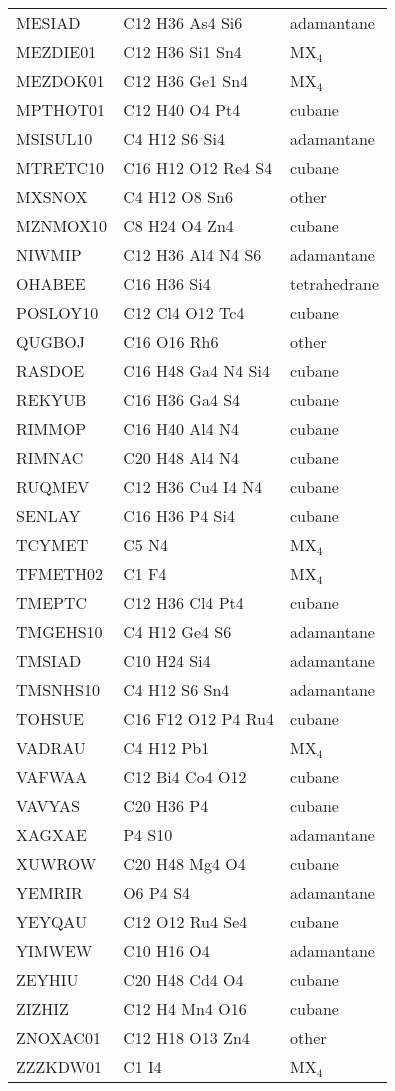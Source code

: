 \documentclass{article}
\begin{document}
\begin{tabular}{lll}
MESIAD & C12 H36 As4 Si6 & adamantane\\
MEZDIE01 & C12 H36 Si1 Sn4 & MX$_4$\\
MEZDOK01 & C12 H36 Ge1 Sn4 & MX$_4$\\
MPTHOT01 & C12 H40 O4 Pt4 & cubane \\
MSISUL10 & C4 H12 S6 Si4 & adamantane\\
MTRETC10 & C16 H12 O12 Re4 S4 & cubane\\
MXSNOX & C4 H12 O8 Sn6 & other\\
MZNMOX10 & C8 H24 O4 Zn4 & cubane\\
NIWMIP & C12 H36 Al4 N4 S6 & adamantane\\
OHABEE & C16 H36 Si4 & tetrahedrane\\
POSLOY10 & C12 Cl4 O12 Tc4 & cubane\\
QUGBOJ & C16 O16 Rh6 & other\\
RASDOE & C16 H48 Ga4 N4 Si4 & cubane\\
REKYUB & C16 H36 Ga4 S4 & cubane\\
RIMMOP & C16 H40 Al4 N4 & cubane\\
RIMNAC & C20 H48 Al4 N4 & cubane\\
RUQMEV & C12 H36 Cu4 I4 N4 & cubane\\
SENLAY & C16 H36 P4 Si4 & cubane\\
TCYMET & C5 N4 & MX$_4$\\
TFMETH02 & C1 F4 & MX$_4$\\
TMEPTC & C12 H36 Cl4 Pt4 & cubane\\
TMGEHS10 & C4 H12 Ge4 S6 & adamantane\\
TMSIAD & C10 H24 Si4 & adamantane\\
TMSNHS10 & C4 H12 S6 Sn4 & adamantane\\
TOHSUE & C16 F12 O12 P4 Ru4 & cubane\\
VADRAU & C4 H12 Pb1 & MX$_4$\\
VAFWAA & C12 Bi4 Co4 O12 & cubane\\
VAVYAS & C20 H36 P4 & cubane\\
XAGXAE & P4 S10 & adamantane\\
XUWROW & C20 H48 Mg4 O4 & cubane\\
YEMRIR & O6 P4 S4 & adamantane\\
YEYQAU & C12 O12 Ru4 Se4 & cubane\\
YIMWEW & C10 H16 O4 & adamantane\\
ZEYHIU & C20 H48 Cd4 O4 & cubane\\
ZIZHIZ & C12 H4 Mn4 O16 & cubane\\
ZNOXAC01 & C12 H18 O13 Zn4 & other\\
ZZZKDW01 & C1 I4 & MX$_4$\\
\hline
\end{tabular}
\end{document}
